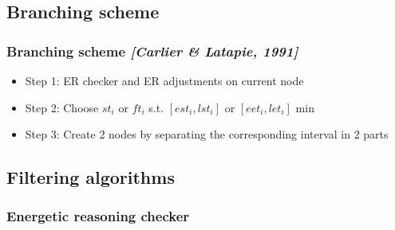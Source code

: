 \subsection{Branching scheme}

\begin{frame}
  \frametitle{Branching scheme {\small \it \color{gray!50!black!50} [Carlier \& Latapie, 1991]}}
  \begin{itemize}
    \vfill
  \item Step 1: ER checker and ER adjustments on current node 
    \vfill    
  \item Step 2: Choose $st_i$ or $ft_i$ s.t. $[est_i,lst_i]$ or
    $[eet_i,let_i]$ min
    \vfill
  \item Step 3: Create 2 nodes by separating the corresponding interval in 2 parts
  \end{itemize}
  \begin{overlayarea}{\textwidth}{4cm}
  \end{overlayarea}
  \vfill
\end{frame}

\subsection{Filtering algorithms}
\subsubsection{Energetic reasoning checker}



